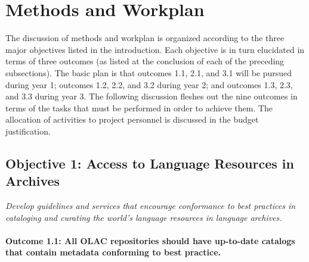 \section{Methods and Workplan}

The discussion of methods and workplan is organized according to
the three major objectives listed in the introduction.
Each objective is in turn elucidated in terms of three outcomes
(as listed at the conclusion of each of the preceding subsections).
The basic plan is that outcomes 1.1, 2.1, and 3.1 will be pursued
during year 1; outcomes 1.2, 2.2, and 3.2 during year 2;
and outcomes 1.3, 2.3, and 3.3 during year 3.
The following discussion fleshes out the nine outcomes in terms of the
tasks that must be performed in order to achieve them. The allocation of activities to project
personnel is discussed in the budget justification.


\subsection*{Objective 1: Access to Language Resources in Archives}

\emph{Develop guidelines and services that encourage conformance to best
practices in cataloging and curating the world's language resources
in language archives.}

\def\task{1.1}
\paragraph{Outcome {\task}: All OLAC repositories should have up-to-date catalogs
      that contain metadata conforming to best practice.}

